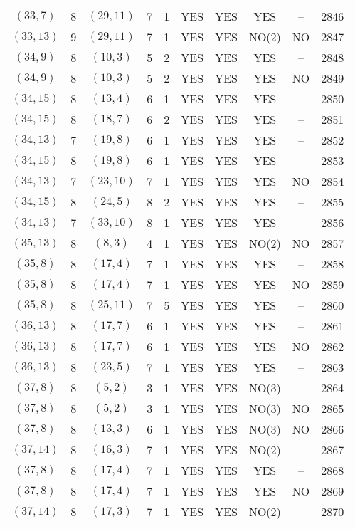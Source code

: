 \begin{longtable}{|c|c|c|c|c|c|c|c|c|c|}
$(33, 7)$ & 8 & $(29, 11)$ & 7 & 1 & YES & YES & YES & -- & 2846\\
$(33, 13)$ & 9 & $(29, 11)$ & 7 & 1 & YES & YES & NO(2) & NO & 2847\\
$(34, 9)$ & 8 & $(10, 3)$ & 5 & 2 & YES & YES & YES & -- & 2848\\
$(34, 9)$ & 8 & $(10, 3)$ & 5 & 2 & YES & YES & YES & NO & 2849\\
$(34, 15)$ & 8 & $(13, 4)$ & 6 & 1 & YES & YES & YES & -- & 2850\\
$(34, 15)$ & 8 & $(18, 7)$ & 6 & 2 & YES & YES & YES & -- & 2851\\
$(34, 13)$ & 7 & $(19, 8)$ & 6 & 1 & YES & YES & YES & -- & 2852\\
$(34, 15)$ & 8 & $(19, 8)$ & 6 & 1 & YES & YES & YES & -- & 2853\\
$(34, 13)$ & 7 & $(23, 10)$ & 7 & 1 & YES & YES & YES & NO & 2854\\
$(34, 15)$ & 8 & $(24, 5)$ & 8 & 2 & YES & YES & YES & -- & 2855\\
$(34, 13)$ & 7 & $(33, 10)$ & 8 & 1 & YES & YES & YES & -- & 2856\\
$(35, 13)$ & 8 & $(8, 3)$ & 4 & 1 & YES & YES & NO(2) & NO & 2857\\
$(35, 8)$ & 8 & $(17, 4)$ & 7 & 1 & YES & YES & YES & -- & 2858\\
$(35, 8)$ & 8 & $(17, 4)$ & 7 & 1 & YES & YES & YES & NO & 2859\\
$(35, 8)$ & 8 & $(25, 11)$ & 7 & 5 & YES & YES & YES & -- & 2860\\
$(36, 13)$ & 8 & $(17, 7)$ & 6 & 1 & YES & YES & YES & -- & 2861\\
$(36, 13)$ & 8 & $(17, 7)$ & 6 & 1 & YES & YES & YES & NO & 2862\\
$(36, 13)$ & 8 & $(23, 5)$ & 7 & 1 & YES & YES & YES & -- & 2863\\
$(37, 8)$ & 8 & $(5, 2)$ & 3 & 1 & YES & YES & NO(3) & -- & 2864\\
$(37, 8)$ & 8 & $(5, 2)$ & 3 & 1 & YES & YES & NO(3) & NO & 2865\\
$(37, 8)$ & 8 & $(13, 3)$ & 6 & 1 & YES & YES & NO(3) & NO & 2866\\
$(37, 14)$ & 8 & $(16, 3)$ & 7 & 1 & YES & YES & NO(2) & -- & 2867\\
$(37, 8)$ & 8 & $(17, 4)$ & 7 & 1 & YES & YES & YES & -- & 2868\\
$(37, 8)$ & 8 & $(17, 4)$ & 7 & 1 & YES & YES & YES & NO & 2869\\
$(37, 14)$ & 8 & $(17, 3)$ & 7 & 1 & YES & YES & NO(2) & -- & 2870\\

\end{longtable}
